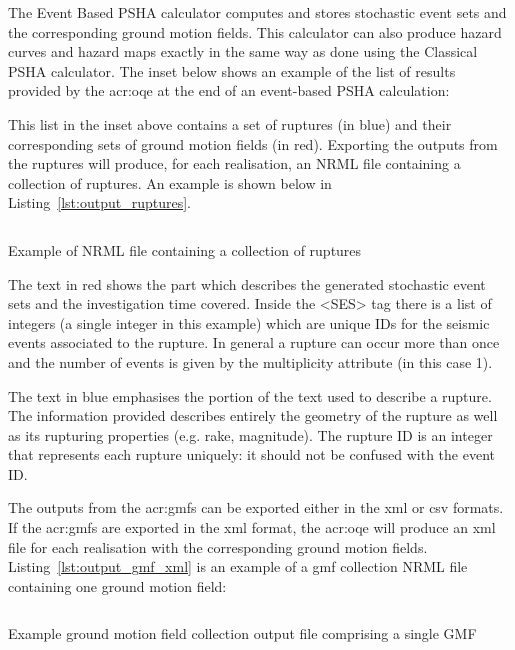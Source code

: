 The Event Based PSHA calculator computes and stores stochastic event sets and
the corresponding ground motion fields. This calculator can also produce
hazard curves and hazard maps exactly in the same way as done using the
Classical PSHA calculator. The inset below shows an example of the list of
results provided by the \gls{acr:oqe} at the end of an event-based PSHA
calculation:



This list in the inset above contains a set of ruptures (in blue) and their
corresponding sets of ground motion fields (in red). Exporting the outputs
from the ruptures will produce, for each realisation, an NRML file containing
a collection of ruptures. An example is shown below in Listing~\ref{lst:output_ruptures}.


\begin{listing}[htbp]
  \inputminted[firstline=1,firstnumber=1,fontsize=\footnotesize,frame=single,linenos,bgcolor=lightgray]{xml}{oqum/hazard/verbatim/output_ses}
  \caption{Example of NRML file containing a collection of ruptures}
  \label{lst:output_ruptures}
\end{listing}

The text in red shows the part which describes the generated
stochastic event sets and the investigation time covered. Inside the
<SES> tag there is a list of integers (a single integer in this example)
which are unique IDs for the seismic events associated to the rupture.
In general a rupture can occur more than once and the number of events
is given by the multiplicity attribute (in this case 1).

The text in blue emphasises the portion of the text used to describe a
rupture. The information provided describes entirely the geometry of the
rupture as well as its rupturing properties (e.g. rake, magnitude). The
rupture ID is an integer that represents each rupture uniquely: it should
not be confused with the event ID.

The outputs from the \glspl{acr:gmf} can be exported either in the xml or csv
formats. If the \glspl{acr:gmf} are exported in the xml format, the
\gls{acr:oqe} will produce an xml file for each realisation with the
corresponding ground motion fields. Listing~\ref{lst:output_gmf_xml} is an
example of a gmf collection NRML file containing one ground motion field:

\begin{listing}[htbp]
  \inputminted[firstline=1,firstnumber=1,fontsize=\footnotesize,frame=single,linenos,bgcolor=lightgray]{xml}{oqum/hazard/verbatim/output_gmf.xml}
  \caption{Example ground motion field collection output file comprising a single GMF}
  \label{lst:output_gmf_xml}
\end{listing}


